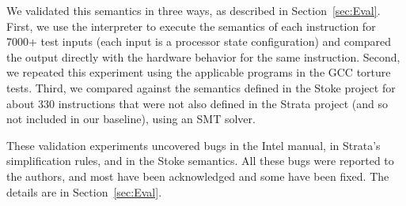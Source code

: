 We validated this semantics in three ways, as described in Section~\ref{sec:Eval}.
%
First, we use the \K interpreter to execute the semantics of each instruction for 7000+ test inputs (each input is a processor state configuration) and compared the output directly with the hardware behavior for the same instruction.
%
Second, we repeated this experiment using the applicable programs in the GCC torture tests.  %
%
Third, we compared against the semantics defined in the Stoke project for about 330 instructions that were not also defined in the Strata project (and so not included in our baseline), using an SMT solver.

These validation experiments uncovered bugs in the Intel manual, in Strata's simplification rules, and in the Stoke semantics.  All these bugs were reported to the authors, and most have been acknowledged and some have been fixed.  The details are in Section~\ref{sec:Eval}.


